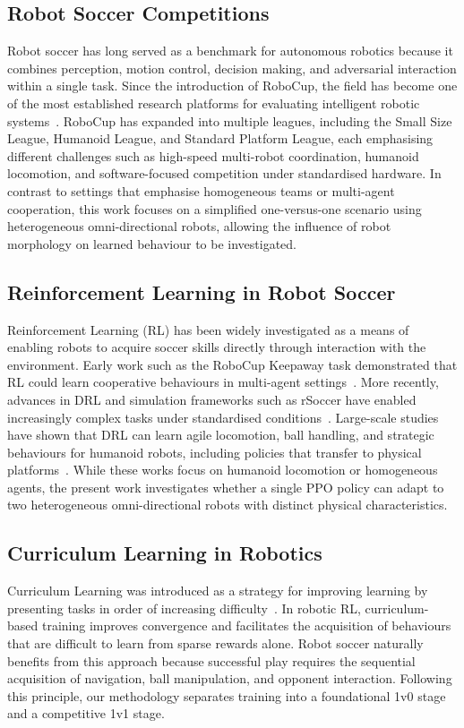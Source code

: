 \documentclass[conference]{IEEEtran}
\begin{document}
\subsection{Robot Soccer Competitions}
Robot soccer has long served as a benchmark for autonomous robotics because it
combines perception, motion control, decision making, and adversarial interaction
within a single task. Since the introduction of RoboCup, the field has become one
of the most established research platforms for evaluating intelligent robotic
systems~\cite{kitano1998robocup}. RoboCup has expanded into multiple leagues,
including the Small Size League, Humanoid League, and Standard Platform League,
each emphasising different challenges such as high-speed multi-robot coordination,
humanoid locomotion, and software-focused competition under standardised hardware.
In contrast to settings that emphasise homogeneous teams or multi-agent
cooperation, this work focuses on a simplified one-versus-one scenario using
heterogeneous omni-directional robots, allowing the influence of robot morphology
on learned behaviour to be investigated.

\subsection{Reinforcement Learning in Robot Soccer}
Reinforcement Learning (RL) has been widely investigated as a means of enabling
robots to acquire soccer skills directly through interaction with the environment.
Early work such as the RoboCup Keepaway task demonstrated that RL could learn
cooperative behaviours in multi-agent settings~\cite{stone2005keepaway}. More
recently, advances in DRL and simulation frameworks such as rSoccer have enabled
increasingly complex tasks under standardised conditions~\cite{martins2021rsoccer}.
Large-scale studies have shown that DRL can learn agile locomotion, ball handling,
and strategic behaviours for humanoid robots, including policies that transfer to
physical platforms~\cite{haarnoja2023agilesoccer, tirumala2024visionsoccer}. While
these works focus on humanoid locomotion or homogeneous agents, the present work
investigates whether a single PPO policy can adapt to two heterogeneous
omni-directional robots with distinct physical characteristics.

\subsection{Curriculum Learning in Robotics}
Curriculum Learning was introduced as a strategy for improving learning by
presenting tasks in order of increasing difficulty~\cite{bengio2009curriculum}. In
robotic RL, curriculum-based training improves convergence and facilitates the
acquisition of behaviours that are difficult to learn from sparse rewards alone.
Robot soccer naturally benefits from this approach because successful play requires
the sequential acquisition of navigation, ball manipulation, and opponent
interaction. Following this principle, our methodology separates training into a
foundational 1v0 stage and a competitive 1v1 stage.
\end{document}

